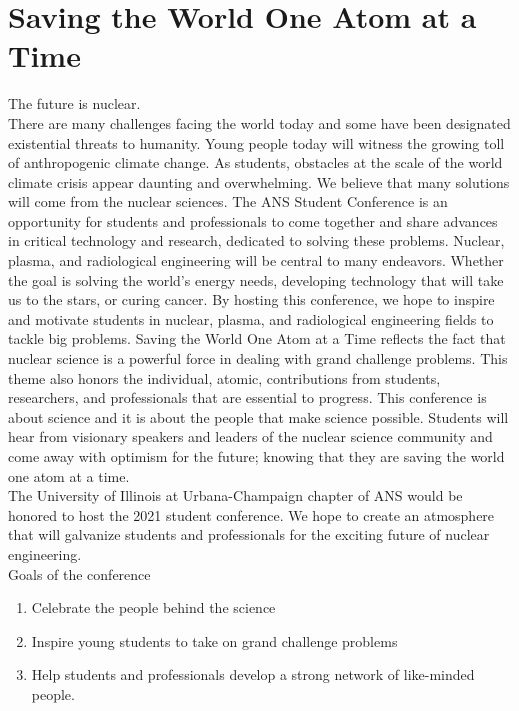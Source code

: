 \section{Saving the World One Atom at a Time}
The future is nuclear.\\
There are many challenges facing the world today and some have been designated existential threats to humanity. Young people today will witness the growing toll of anthropogenic climate change. As students, obstacles at the scale of the world climate crisis appear daunting and overwhelming. We believe that many solutions will come from the nuclear sciences. The ANS Student Conference is an opportunity for students and professionals to come together and share advances in critical technology and research, dedicated to solving these problems. Nuclear, plasma, and radiological engineering will be central to many endeavors. Whether the goal is solving the world’s energy needs, developing technology that will take us to the stars, or curing cancer. By hosting this conference, we hope to inspire and motivate students in nuclear, plasma, and radiological engineering fields to tackle big problems. Saving the World One Atom at a Time reflects the fact that nuclear science is a powerful force in dealing with grand challenge problems. This theme also honors the individual, atomic, contributions from students, researchers, and professionals that are essential to progress. This conference is about science and it is about the people that make science possible. Students will hear from visionary speakers and leaders of the nuclear science community and come away with optimism for the future; knowing that they are saving the world one atom at a time.\\
The University of Illinois at Urbana-Champaign chapter of ANS would be honored to host the 2021 student conference. We hope to create an atmosphere that will galvanize students and professionals for the exciting future of nuclear engineering.\\

Goals of the conference
\begin{enumerate}
	\item Celebrate the people behind the science
	\item Inspire young students to take on grand challenge problems
	\item Help students and professionals develop a strong network of like-minded people. 
\end{enumerate}